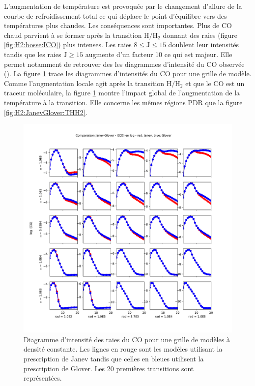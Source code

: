 L'augmentation de température est provoquée par le changement d'allure de la courbe de refroidissement total ce qui déplace le point d'équilibre vers des températures plus chaudes. Les conséquences sont importantes. Plus de $\mathrm{CO}$ chaud parvient à se former après la transition $\mathrm{H}/\mathrm{H}_2$ donnant des raies (figure \ref{fig:H2:bosse:ICO}) plus intenses. Les raies $ 8 \leq \mathrm{J}\leq 15$ doublent leur intensités tandis que les raies $\mathrm{J}\geq 15$ augmente d'un facteur 10 ce qui est majeur. Elle permet notamment de retrouver des les diagrammes d'intensité du $\mathrm{CO}$ observée (\cite{COJoblin}). La figure \ref{fig:H2:bosse:IgridCO} trace les diagrammes d'intensités du $\mathrm{CO}$ pour une grille de modèle. Comme l'augmentation locale agit après la transition $\mathrm{H}/\mathrm{H}_2$ et que le $\mathrm{CO}$ est un traceur moléculaire, la figure \ref{fig:H2:bosse:IgridCO} montre l'impact global de l'augmentation de la température à la transition. Elle concerne les mêmes régions PDR que la figure \ref{fig:H2:JanevGlover:THH2}. 

\begin{figure}[!p]
    \centering
    \includegraphics[trim = {0 0 0 3cm },clip,width=1\textwidth]{figure/H2/bosse_dcte_janevVSglover/PlotComp_Janev_Glover_IntCO.pdf}
    \caption{Diagramme d'intensité des raies du $\mathrm{CO}$ pour une grille de modèles à densité constante. Les lignes en rouge sont les modèles utilisant la prescription de Janev tandis que celles en bleues utilisent la prescription de Glover. Les $20$ premières transitions sont représentées.}
    \label{fig:H2:bosse:IgridCO}
\end{figure}



